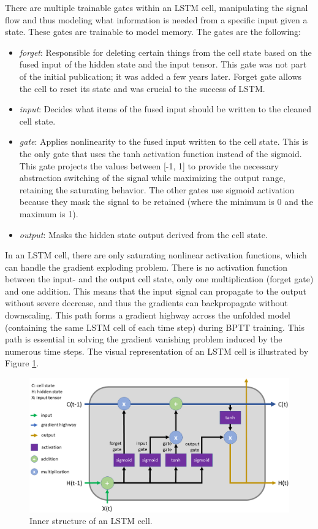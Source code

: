 There are multiple trainable gates within an LSTM cell, manipulating the signal flow and thus modeling what information is needed from a specific input given a state. These gates are trainable to model memory. The gates are the following:

\begin{itemize}
\item \textit{forget}: Responsible for deleting certain things from the cell state based on the fused input of the hidden state and the input tensor. This gate was not part of the initial publication; it was added a few years later\cite{LSTM-ForgetGate}. Forget gate allows the cell to reset its state and was crucial to the success of LSTM.
\item \textit{input}: Decides what items of the fused input should be written to the cleaned cell state.
\item \textit{gate}: Applies nonlinearity to the fused input written to the cell state. This is the only gate that uses the tanh activation function instead of the sigmoid. This gate projects the values between [-1, 1] to provide the necessary abstraction switching of the signal while maximizing the output range, retaining the saturating behavior. The other gates use sigmoid activation because they mask the signal to be retained (where the minimum is 0 and the maximum is 1).
\item \textit{output}: Masks the hidden state output derived from the cell state.
\end{itemize}

In an LSTM cell, there are only saturating nonlinear activation functions, which can handle the gradient exploding problem. There is no activation function between the input- and the output cell state, only one multiplication (forget gate) and one addition. This means that the input signal can propagate to the output without severe decrease, and thus the gradients can backpropagate without downscaling. This path forms a gradient highway across the unfolded model (containing the same LSTM cell of each time step) during BPTT training. This path is essential in solving the gradient vanishing problem induced by the numerous time steps. The visual representation of an LSTM cell is illustrated by Figure \ref{fig:LSTM}.

\begin{figure}[htb]
 \centerline{\includegraphics[width=1.0\columnwidth]{.//Figure/Sequential/LSTM.png}}
 \caption{Inner structure of an LSTM cell.}
 \label{fig:LSTM}
\end{figure}

